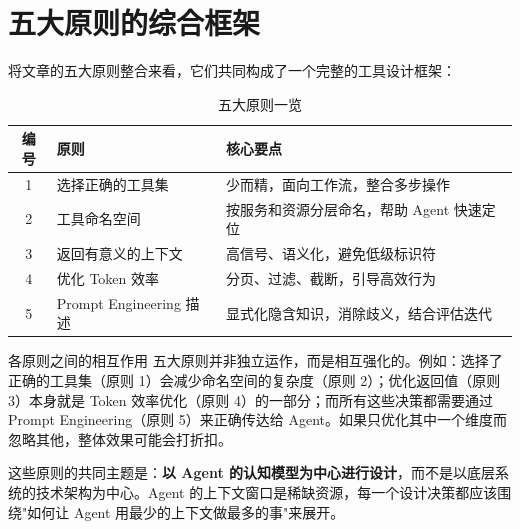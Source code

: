 \section{五大原则的综合框架}

将文章的五大原则整合来看，它们共同构成了一个完整的工具设计框架：

\begin{table}[H]
\centering
\caption{五大原则一览}
\begin{tabular}{clp{}}
\toprule
\textbf{编号} & \textbf{原则} & \textbf{核心要点} \\
\midrule
1 & 选择正确的工具集 & 少而精，面向工作流，整合多步操作 \\
2 & 工具命名空间 & 按服务和资源分层命名，帮助 Agent 快速定位 \\
3 & 返回有意义的上下文 & 高信号、语义化，避免低级标识符 \\
4 & 优化 Token 效率 & 分页、过滤、截断，引导高效行为 \\
5 & Prompt Engineering 描述 & 显式化隐含知识，消除歧义，结合评估迭代 \\
\bottomrule
\end{tabular}
\end{table}

\begin{warningbox}{各原则之间的相互作用}
五大原则并非独立运作，而是相互强化的。例如：选择了正确的工具集（原则 1）会减少命名空间的复杂度（原则 2）；优化返回值（原则 3）本身就是 Token 效率优化（原则 4）的一部分；而所有这些决策都需要通过 Prompt Engineering（原则 5）来正确传达给 Agent。如果只优化其中一个维度而忽略其他，整体效果可能会打折扣。
\end{warningbox}

这些原则的共同主题是：\textbf{以 Agent 的认知模型为中心进行设计}，而不是以底层系统的技术架构为中心。Agent 的上下文窗口是稀缺资源，每一个设计决策都应该围绕"如何让 Agent 用最少的上下文做最多的事"来展开。


